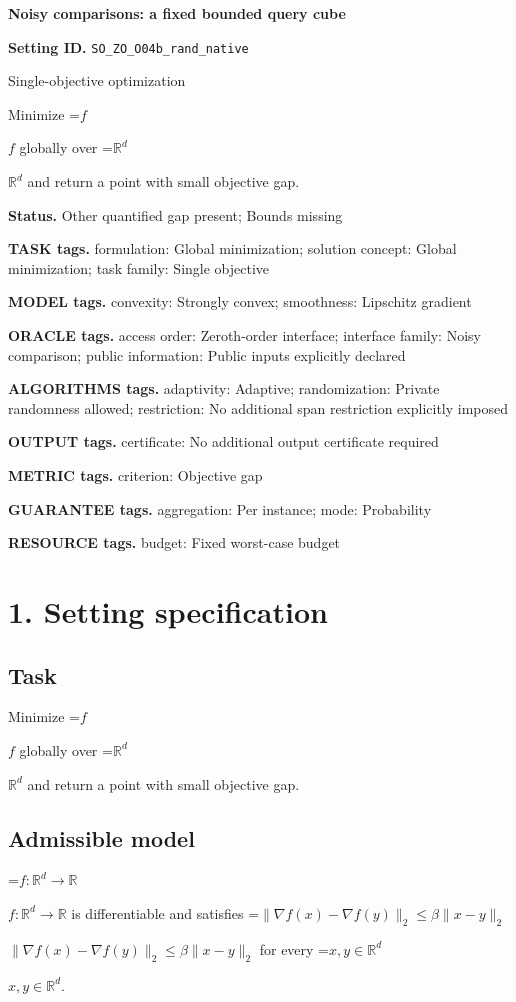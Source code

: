 \documentclass[10pt,a4paper]{article}
\newcommand{\AtlasMath}[1]{\par\begingroup\centering\setbox0=\hbox{$\displaystyle #1$}\ifdim\wd0>1.4\linewidth\typeout{ATLAS WIDE FORMULA: \the\wd0}\fi\ifdim\wd0>\linewidth\resizebox{\linewidth}{!}{\box0}\else\box0\fi\par\endgroup}
\newcommand{\AtlasInlineMath}[1]{\begingroup\setbox0=\hbox{$#1$}\ifdim\wd0>.4\linewidth\endgroup\AtlasMath{#1}\else\endgroup$#1$\fi}
\begin{document}
\raggedright

{\LARGE\bfseries\sffamily\color{AtlasNavy} Noisy comparisons: a fixed bounded query cube\par}\vspace{5pt}
\textbf{Setting ID.} \texttt{SO\_\allowbreak{}ZO\_\allowbreak{}O04b\_\allowbreak{}rand\_\allowbreak{}native}

Single-objective optimization

Minimize \AtlasInlineMath{f} globally over \AtlasInlineMath{\mathbb{R}^d} and return a point with small objective gap.

\textbf{Status.} Other quantified gap present; Bounds missing

\textbf{TASK tags.} formulation: Global minimization; solution concept: Global minimization; task family: Single objective

\textbf{MODEL tags.} convexity: Strongly convex; smoothness: Lipschitz gradient

\textbf{ORACLE tags.} access order: Zeroth-order interface; interface family: Noisy comparison; public information: Public inputs explicitly declared

\textbf{ALGORITHMS tags.} adaptivity: Adaptive; randomization: Private randomness allowed; restriction: No additional span restriction explicitly imposed

\textbf{OUTPUT tags.} certificate: No additional output certificate required

\textbf{METRIC tags.} criterion: Objective gap

\textbf{GUARANTEE tags.} aggregation: Per instance; mode: Probability

\textbf{RESOURCE tags.} budget: Fixed worst-case budget

\section{1. Setting specification}
\subsection{Task}
Minimize \AtlasInlineMath{f} globally over \AtlasInlineMath{\mathbb{R}^d} and return a point with small objective gap.

\subsection{Admissible model}
\AtlasInlineMath{f:\mathbb{R}^d\to\mathbb{R}} is differentiable and satisfies \AtlasInlineMath{\|\nabla f(x)-\nabla f(y)\|_2\le\beta\|x-y\|_2} for every \AtlasInlineMath{x,y\in\mathbb{R}^d}.
\end{document}
